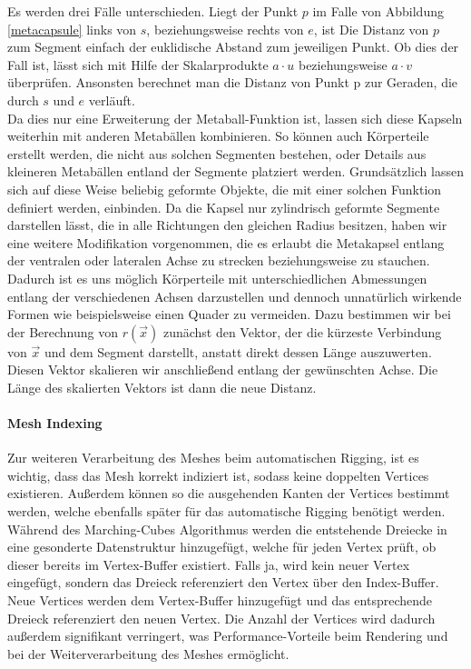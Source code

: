 Es werden drei Fälle unterschieden. Liegt der Punkt $p$ im Falle von Abbildung \ref{metacapsule} links von $s$, beziehungsweise rechts von $e$, ist Die Distanz von $p$ zum Segment einfach der euklidische Abstand zum jeweiligen Punkt. Ob dies der Fall ist, lässt sich mit Hilfe der Skalarprodukte $a\cdot u$ beziehungsweise $a\cdot v$ überprüfen. Ansonsten berechnet man die Distanz von Punkt p zur Geraden, die durch $s$ und $e$ verläuft.\\

Da dies nur eine Erweiterung der Metaball-Funktion ist, lassen sich diese Kapseln weiterhin mit anderen Metabällen kombinieren. So können auch Körperteile erstellt werden, die nicht aus solchen Segmenten bestehen, oder Details aus kleineren Metabällen entland der Segmente platziert werden. Grundsätzlich lassen sich auf diese Weise beliebig geformte Objekte, die mit einer solchen Funktion definiert werden, einbinden.
Da die Kapsel nur zylindrisch geformte Segmente darstellen lässt, die in alle Richtungen den gleichen Radius besitzen, haben wir eine weitere Modifikation vorgenommen, die es erlaubt die Metakapsel entlang der ventralen oder lateralen Achse zu strecken beziehungsweise zu stauchen. Dadurch ist es uns möglich Körperteile mit unterschiedlichen Abmessungen entlang der verschiedenen Achsen darzustellen und dennoch unnatürlich wirkende Formen wie beispielsweise einen Quader zu vermeiden.
Dazu bestimmen wir bei der Berechnung von $r(\vec{x})$ zunächst den Vektor, der die kürzeste Verbindung von $\vec{x}$ und dem Segment darstellt, anstatt direkt dessen Länge auszuwerten. Diesen Vektor skalieren wir anschließend entlang der gewünschten Achse. Die Länge des skalierten Vektors ist dann die neue Distanz.

\paragraph{Mesh Indexing}
Zur weiteren Verarbeitung des Meshes beim automatischen Rigging, ist es wichtig, dass das Mesh korrekt indiziert ist, sodass keine doppelten Vertices existieren. Außerdem können so die ausgehenden Kanten der Vertices bestimmt werden, welche ebenfalls später für das automatische Rigging benötigt werden. Während des Marching-Cubes Algorithmus werden die entstehende Dreiecke in eine gesonderte Datenstruktur hinzugefügt, welche für jeden Vertex prüft, ob dieser bereits im Vertex-Buffer existiert. Falls ja, wird kein neuer Vertex eingefügt, sondern das Dreieck referenziert den Vertex über den Index-Buffer. Neue Vertices werden dem Vertex-Buffer hinzugefügt und das entsprechende Dreieck referenziert den neuen Vertex. Die Anzahl der Vertices wird dadurch außerdem signifikant verringert, was Performance-Vorteile beim Rendering und bei der Weiterverarbeitung des Meshes ermöglicht.

